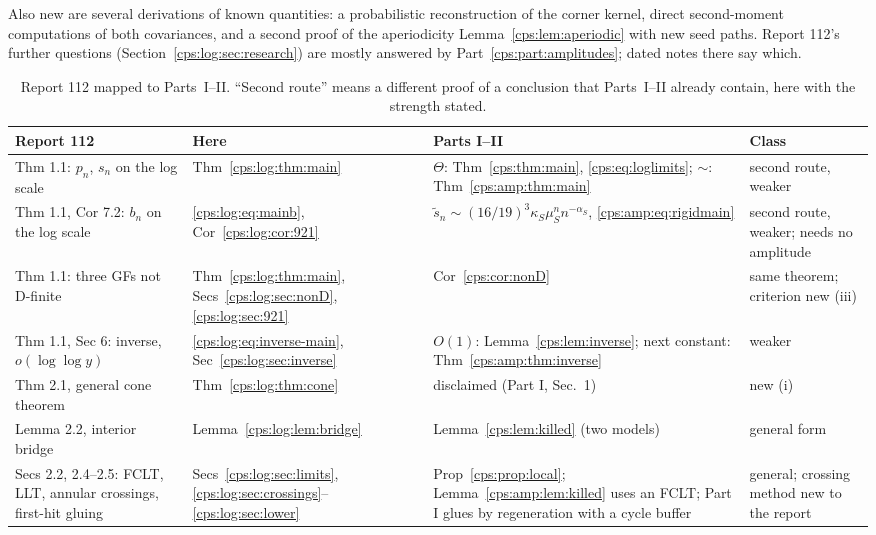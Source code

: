 \documentclass[11pt,letterpaper]{article}
\numberwithin{equation}{section}
\theoremstyle{remark}\newtheorem{remark}[theorem]{Remark}
\begin{document}
Also new are several derivations of known quantities: a probabilistic reconstruction of the
corner kernel, direct second-moment computations of both covariances, and a second proof of the
aperiodicity Lemma~\ref{cps:lem:aperiodic} with new seed paths. Report 112's further questions
(Section~\ref{cps:log:sec:research}) are mostly answered by Part~\ref{cps:part:amplitudes};
dated notes there say which.

\begin{table}[htbp]
\centering\footnotesize
\caption{Report 112 mapped to Parts~I--II. ``Second route'' means a different proof of a
conclusion that Parts~I--II already contain, here with the strength stated.}\label{cps:log:tab:map}
\begin{tabular}{@{}>{\raggedright}p{}>{\raggedright}p{}>{\raggedright}p{}>{\raggedright\arraybackslash}p{}@{}}
\toprule
Report 112 & Here & Parts I--II & Class\\
\midrule
Thm 1.1: $p_n$, $s_n$ on the log scale & Thm~\ref{cps:log:thm:main} & $\Theta$: Thm~\ref{cps:thm:main}, \eqref{cps:eq:loglimits}; $\sim$: Thm~\ref{cps:amp:thm:main} & second route, weaker\\
Thm 1.1, Cor 7.2: $b_n$ on the log scale & \eqref{cps:log:eq:mainb}, Cor~\ref{cps:log:cor:921} & $\widetilde s_n\sim(16/19)^3\kappa_S\mu_S^nn^{-\alpha_S}$, \eqref{cps:amp:eq:rigidmain} & second route, weaker; needs no amplitude\\
Thm 1.1: three GFs not D-finite & Thm~\ref{cps:log:thm:main}, Secs~\ref{cps:log:sec:nonD}, \ref{cps:log:sec:921} & Cor~\ref{cps:cor:nonD} & same theorem; criterion new (iii)\\
Thm 1.1, Sec 6: inverse, $o(\log\log y)$ & \eqref{cps:log:eq:inverse-main}, Sec~\ref{cps:log:sec:inverse} & $O(1)$: Lemma~\ref{cps:lem:inverse}; next constant: Thm~\ref{cps:amp:thm:inverse} & weaker\\
Thm 2.1, general cone theorem & Thm~\ref{cps:log:thm:cone} & disclaimed (Part I, Sec.~1) & new (i)\\
Lemma 2.2, interior bridge & Lemma~\ref{cps:log:lem:bridge} & Lemma~\ref{cps:lem:killed} (two models) & general form\\
Secs 2.2, 2.4--2.5: FCLT, LLT, annular crossings, first-hit gluing & Secs~\ref{cps:log:sec:limits}, \ref{cps:log:sec:crossings}--\ref{cps:log:sec:lower} & Prop~\ref{cps:prop:local}; Lemma~\ref{cps:amp:lem:killed} uses an FCLT; Part I glues by regeneration with a cycle buffer & general; crossing method new to the report\\

\end{tabular}
\end{table}
\end{document}
